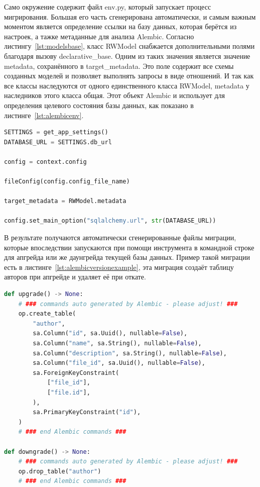 \documentclass[14pt]{extarticle}
\begin{document}
Само окружение содержит файл env.py, который запускает процесс мигрирования. Большая его часть сгенерирована автоматически, и самым
важным моментом является определение ссылки на базу данных, которая берётся из настроек, а тажке метаданные для анализа Alembic. 
Согласно листингу~\ref{lst:modelsbase}, класс RWModel снабжается дополнительными полями благодаря вызову declarative\_base. Одним из таких
значения является значение metadata, сохранённого в target\_metadata. Это поле содержит все схемы созданных моделей и позволяет выполнять запросы в виде отношений. И так как
все классы наследуются от одного единственного класса RWModel, metadata у наследников этого класса общая. Этот объект Alembic и 
использует для определения целевого состояния базы данных, как показано в листинге~\ref{lst:alembicenv}.

\begin{lstlisting}[caption={Конфигурация окружения Alembic}, label={lst:alembicenv}, language=Python]
SETTINGS = get_app_settings()
DATABASE_URL = SETTINGS.db_url

config = context.config

fileConfig(config.config_file_name)

target_metadata = RWModel.metadata

config.set_main_option("sqlalchemy.url", str(DATABASE_URL))
\end{lstlisting}

В результате получаются автоматически сгенерированные файлы миграции, которые впоследствии запускаются при помощи инструмента в 
командной строке для апгрейда или же даунгрейда текущей базы данных. Пример такой миграции есть в листинге~\ref{lst:alembicversionexample}, эта миграция
создаёт таблицу авторов при апгрейде и удаляет её при откате.

\begin{lstlisting}[caption={Пример миграции Alembic}, label={lst:alembicversionexample}, language=Python]
def upgrade() -> None:
    # ### commands auto generated by Alembic - please adjust! ###
    op.create_table(
        "author",
        sa.Column("id", sa.Uuid(), nullable=False),
        sa.Column("name", sa.String(), nullable=False),
        sa.Column("description", sa.String(), nullable=False),
        sa.Column("file_id", sa.Uuid(), nullable=False),
        sa.ForeignKeyConstraint(
            ["file_id"],
            ["file.id"],
        ),
        sa.PrimaryKeyConstraint("id"),
    )
    # ### end Alembic commands ###

def downgrade() -> None:
    # ### commands auto generated by Alembic - please adjust! ###
    op.drop_table("author")
    # ### end Alembic commands ###
\end{lstlisting}
\end{document}
